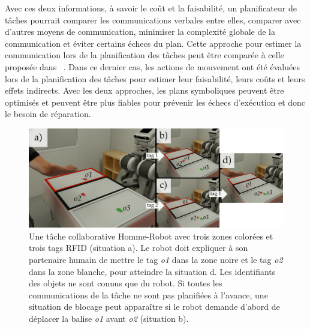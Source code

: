Avec ces deux informations, à savoir le coût et la faisabilité, un planificateur de tâches pourrait comparer les communications verbales entre elles, comparer avec d'autres moyens de communication, minimiser la complexité globale de la communication et éviter certains échecs du plan. Cette approche pour estimer la communication lors de la planification des tâches peut être comparée à celle proposée dans ~\cite{lallement_2016_symbolic}. Dans ce dernier cas, les actions de mouvement ont été évaluées lors de la planification des tâches pour estimer leur faisabilité, leurs coûts et leurs effets indirects. Avec les deux approches, les plans symboliques peuvent être optimisés et peuvent être plus fiables pour prévenir les échecs d'exécution et donc le besoin de réparation. 

\begin{figure}[t!]
\centering
\includegraphics[width=\textwidth]{figures/chapter5/intro/intro.png}
\caption{\label{fig:annex_chap5_intro} Une tâche collaborative Homme-Robot avec trois zones colorées et trois tags RFID (situation a). Le robot doit expliquer à son partenaire humain de mettre le tag \textit{o1} dans la zone noire et le tag \textit{o2} dans la zone blanche, pour atteindre la situation d. Les identifiants des objets ne sont connus que du robot.
Si toutes les communications de la tâche ne sont pas planifiées à l'avance, une situation de blocage peut apparaître si le robot demande d'abord de déplacer la balise \textit{o1} avant \textit{o2} (situation b).}
\end{figure}

